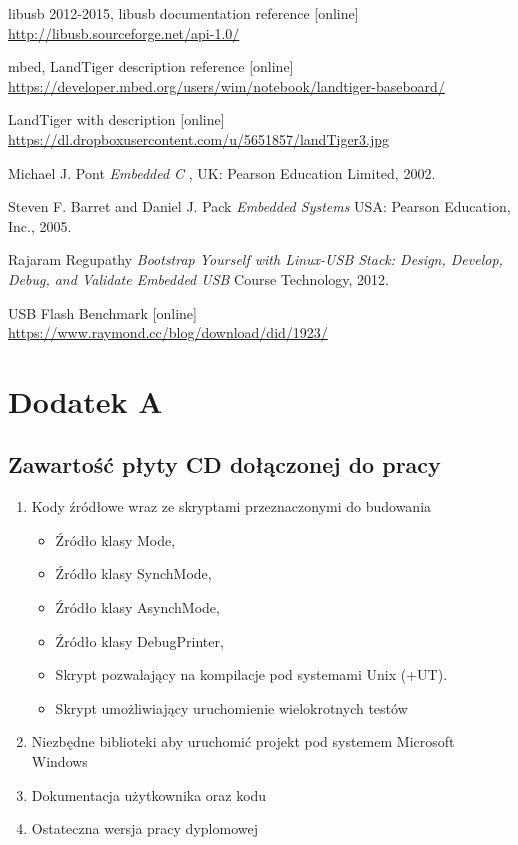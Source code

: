\documentclass{BscUS}
\newcommand\blankpage{%
    \null
    \thispagestyle{empty}%
    \newpage}
\begin{document}
\begin{thebibliography}{1}
 libusb 2012-2015, libusb documentation reference [online]
\newline 
\url{http://libusb.sourceforge.net/api-1.0/}


 mbed, LandTiger description reference [online]
\newline 
\url{https://developer.mbed.org/users/wim/notebook/landtiger-baseboard/}

 LandTiger with description [online] \\
\url{https://dl.dropboxusercontent.com/u/5651857/landTiger3.jpg}

 Michael J. Pont {\em Embedded C       },  UK: Pearson Education Limited, 2002.

 Steven F. Barret and Daniel J. Pack {\em Embedded Systems} USA: Pearson Education, Inc., 2005.

 Rajaram Regupathy {\em Bootstrap Yourself with Linux-USB Stack: Design, Develop, Debug, and Validate Embedded USB } Course Technology, 2012.


 USB Flash Benchmark [online] \\
\url{https://www.raymond.cc/blog/download/did/1923/}
\end{thebibliography}
\afterpage{\blankpage}
\pagestyle{empty}
\appendix
\chapter*{Dodatek A} \label{App:AppendixA}
\section*{Zawartość płyty CD dołączonej do pracy}

\begin{enumerate}
\item Kody źródłowe wraz ze skryptami przeznaczonymi do budowania
\begin{itemize}
\item Źródło klasy Mode,
\item Źródło klasy SynchMode,
\item Źródło klasy AsynchMode,
\item Źródło klasy DebugPrinter,
\item Skrypt pozwalający na kompilacje pod systemami Unix (+UT).
\item Skrypt umożliwiający uruchomienie wielokrotnych testów
\end{itemize}
\item Niezbędne biblioteki aby uruchomić projekt pod systemem Microsoft Windows
\item Dokumentacja użytkownika oraz kodu
\item Ostateczna wersja pracy dyplomowej
\end{enumerate}
\end{document}

